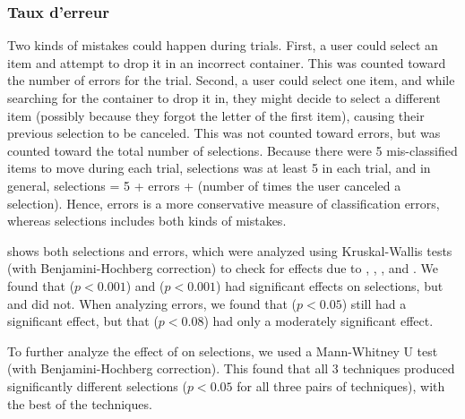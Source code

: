 \subsubsection{Taux d'erreur}
\label{subsubsec:experiment_results_errors}
Two kinds of mistakes could happen during trials. First, a user could select an item and attempt to drop it in an incorrect container. This was counted toward the number of errors for the trial. Second, a user could select one item, and while searching for the container to drop it in, they might decide to select a different item (possibly because they forgot the letter of the first item), causing their previous selection to be canceled. This was not counted toward errors, but was counted toward the total number of selections. Because there were 5 mis-classified items to move during each trial, selections was at least 5 in each trial, and in general, selections = 5 + errors + (number of times the user canceled a selection). Hence, errors is a more conservative measure of classification errors, whereas selections includes both kinds of mistakes.

 shows both selections and errors, which were analyzed using Kruskal-Wallis tests (with Benjamini-Hochberg correction) to check for effects due to , , , and . We found that  ($p < 0.001$) and  ($p < 0.001$) had significant effects on selections, but  and  did not. When analyzing errors, we found that  ($p<0.05$) still had a significant effect, but that  ($p<0.08$) had only a moderately significant effect.


To further analyze the effect of  on selections, we used a Mann-Whitney U test (with Benjamini-Hochberg correction). This found that all 3 techniques produced significantly different selections ($p < 0.05$ for all three pairs of techniques), with  the best of the techniques.


